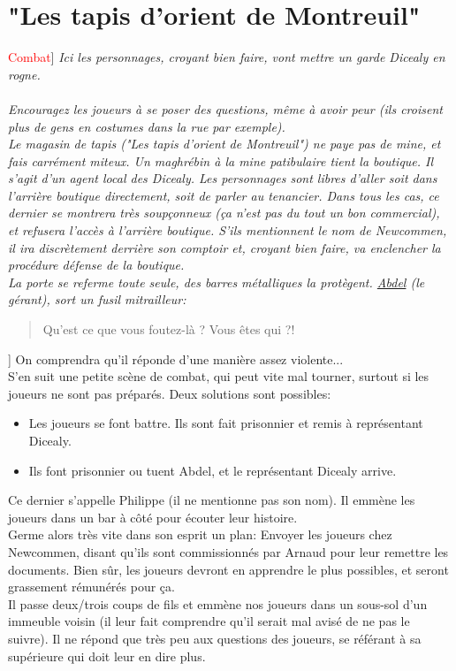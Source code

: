 \documentclass[10pt,a4paper,twocolumn]{article}
\newenvironment{lAbstract}[1]{{[}\textcolor{red}{#1}{]}\itshape}{\\ \\}
\begin{document}
\section{"Les tapis d'orient de Montreuil"}
\begin{lAbstract}{Combat}
Ici les personnages, croyant bien faire, vont mettre un garde Dicealy en rogne.
\end{lAbstract}
Encouragez les joueurs à se poser des questions, même à avoir peur (ils croisent plus de gens en costumes dans la rue par exemple). \\
Le magasin de tapis ("Les tapis d'orient de Montreuil") ne paye pas de mine, et fais carrément miteux. Un maghrébin à la mine patibulaire tient la boutique. Il s'agit d'un agent local des Dicealy. Les personnages sont libres d'aller soit dans l'arrière boutique directement, soit de parler au tenancier. Dans tous les cas, ce dernier se montrera très soupçonneux (ça n'est pas du tout un bon commercial), et refusera l'accès à l'arrière boutique. S'ils mentionnent le nom de Newcommen, il ira discrètement derrière son comptoir et, croyant bien faire, va enclencher la procédure défense de la boutique.\\
La porte se referme toute seule, des barres métalliques la protègent. \hyperlink{abdel}{Abdel} (le gérant), sort un fusil mitrailleur:
\begin{quote}
Qu'est ce que vous foutez-là ? Vous êtes qui ?!
\end{quote}{]}
On comprendra qu'il réponde d'une manière assez violente... \\
S'en suit une petite scène de combat, qui peut vite mal tourner, surtout si les joueurs ne sont pas préparés. Deux solutions sont possibles:
\begin{itemize}
	\item Les joueurs se font battre. Ils sont fait prisonnier et remis à représentant Dicealy.
	\item Ils font prisonnier ou tuent Abdel, et le représentant Dicealy arrive.
\end{itemize}
Ce dernier s'appelle Philippe (il ne mentionne pas son nom). Il emmène les joueurs dans un bar à côté pour écouter leur histoire.\\
Germe alors très vite dans son esprit un plan: Envoyer les joueurs chez Newcommen, disant qu'ils sont commissionnés par Arnaud pour leur remettre les documents. Bien sûr, les joueurs devront en apprendre le plus possibles, et seront grassement rémunérés pour ça. \\
Il passe deux/trois coups de fils et emmène nos joueurs dans un sous-sol d'un immeuble voisin (il leur fait comprendre qu'il serait mal avisé de ne pas le suivre). Il ne répond que très peu aux questions des joueurs, se référant à sa supérieure qui doit leur en dire plus.
\end{document}
